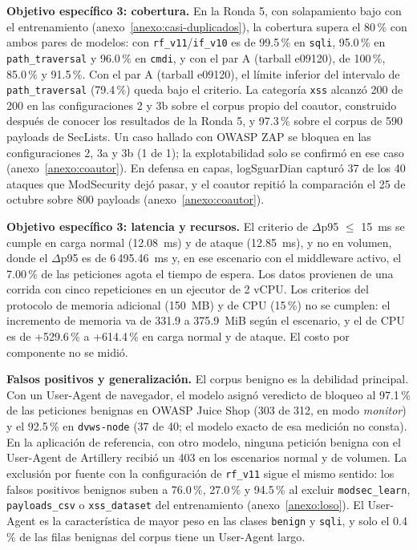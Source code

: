 \textbf{Objetivo específico 3: cobertura.} En la Ronda 5, con solapamiento bajo con el entrenamiento (anexo~\ref{anexo:casi-duplicados}), la cobertura supera el 80\,\% con ambos pares de modelos: con \texttt{rf\_v11}/\texttt{if\_v10} es de 99.5\,\% en \texttt{sqli}, 95.0\,\% en \texttt{path\_traversal} y 96.0\,\% en \texttt{cmdi}, y con el par A (tarball e09120\textellipsis{}), de 100\,\%, 85.0\,\% y 91.5\,\%. Con el par A (tarball e09120\textellipsis{}), el límite inferior del intervalo de \texttt{path\_traversal} (79.4\,\%) queda bajo el criterio. La categoría \texttt{xss} alcanzó 200 de 200 en las configuraciones 2 y 3b sobre el corpus propio del coautor, construido después de conocer los resultados de la Ronda 5, y 97.3\,\% sobre el corpus de 590 payloads de SecLists. Un caso hallado con OWASP ZAP se bloquea en las configuraciones 2, 3a y 3b (1 de 1); la explotabilidad solo se confirmó en ese caso (anexo~\ref{anexo:coautor}). En defensa en capas, logSguarDian capturó 37 de los 40 ataques que ModSecurity dejó pasar, y el coautor repitió la comparación el 25 de octubre sobre 800 payloads (anexo~\ref{anexo:coautor}).

\textbf{Objetivo específico 3: latencia y recursos.} El criterio de $\Delta$p95 $\leq$ 15~ms se cumple en carga normal (12.08~ms) y de ataque (12.85~ms), y no en volumen, donde el $\Delta$p95 es de 6\,495.46~ms y, en ese escenario con el middleware activo, el 7.00\,\% de las peticiones agota el tiempo de espera. Los datos provienen de una corrida con cinco repeticiones en un ejecutor de 2 vCPU. Los criterios del protocolo de memoria adicional (150~MB) y de CPU (15\,\%) no se cumplen: el incremento de memoria va de 331.9 a 375.9~MiB según el escenario, y el de CPU es de +529.6\,\% a +614.4\,\% en carga normal y de ataque. El costo por componente no se midió.

\textbf{Falsos positivos y generalización.} El corpus benigno es la debilidad principal. Con un User-Agent de navegador, el modelo asignó veredicto de bloqueo al 97.1\,\% de las peticiones benignas en OWASP Juice Shop (303 de 312, en modo \textit{monitor}) y el 92.5\,\% en \texttt{dvws-node} (37 de 40; el modelo exacto de esa medición no consta). En la aplicación de referencia, con otro modelo, ninguna petición benigna con el User-Agent de Artillery recibió un 403 en los escenarios normal y de volumen. La exclusión por fuente con la configuración de \texttt{rf\_v11} sigue el mismo sentido: los falsos positivos benignos suben a 76.0\,\%, 27.0\,\% y 94.5\,\% al excluir \texttt{modsec\_learn}, \texttt{payloads\_csv} o \texttt{xss\_dataset} del entrenamiento (anexo~\ref{anexo:loso}). El User-Agent es la característica de mayor peso en las clases \texttt{benign} y \texttt{sqli}, y solo el 0.4\,\% de las filas benignas del corpus tiene un User-Agent largo.

